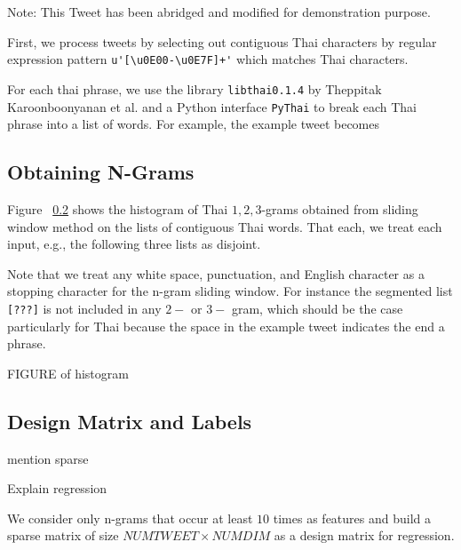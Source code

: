 \documentclass[conference]{IEEEtran}
\newcommand{\col}[1]{\textcolor{awesome}{#1}}
\begin{document}
Note: This Tweet has been abridged and modified for demonstration purpose. 

First, we process tweets by selecting out contiguous Thai characters by regular expression pattern \verb|u'[\u0E00-\u0E7F]+'| which matches Thai characters.

For each thai phrase, we use the library {\tt libthai0.1.4} by Theppitak Karoonboonyanan et al. and a Python interface {\tt PyThai} to break each Thai  phrase into a list of words. For example, the example tweet becomes 

\subsection{Obtaining N-Grams}
Figure ~\ref{} shows the histogram of Thai $1,2,3$-grams obtained from sliding window method on the lists of contiguous Thai words. That each, we treat each input, e.g., the following three lists %
as disjoint. 

Note that we treat any white space, punctuation, and English character as a stopping character for the n-gram sliding window.  For instance the segmented list {\tt [???]} is not included in any $2-$ or $3-$ gram, which should be the case particularly for Thai because the space in the example tweet indicates the end a phrase.





FIGURE of histogram



\subsection{Design Matrix and Labels}
\col{mention sparse}

Explain regression

We consider only n-grams that occur at least $10$ times as features and build a sparse matrix of size $NUMTWEET \times NUMDIM$ as a design matrix for regression. 
\end{document}
